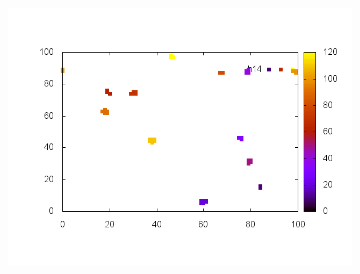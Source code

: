 \documentclass[10pt,a4paper]{article}
\begin{document}
\begin{figure}
\begin{subfigure}[b]{1\textwidth}
\includegraphics[scale=.3]{./img/SCC_Stable3/cut99p/14.png}
\end{subfigure}


\end{figure}
\end{document}
